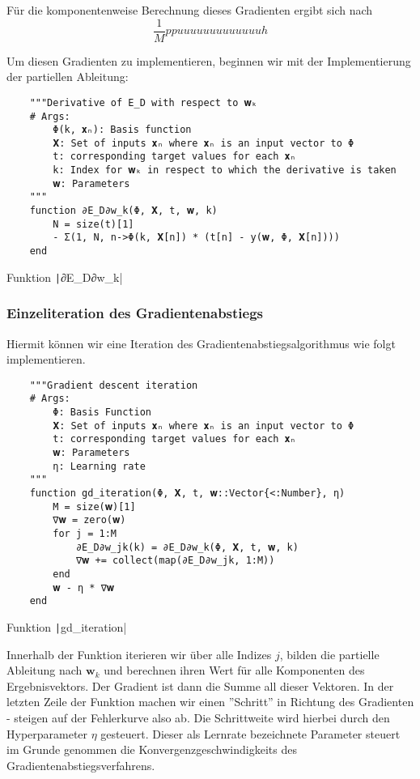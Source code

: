 \documentclass{article}
\theoremstyle{plain} %
\theoremstyle{definition} %
\begin{document}
Für die komponentenweise Berechnung dieses Gradienten ergibt sich nach \cite[S. 95f]{Lippe}
$$
  \frac{1}{M}ppuuuuuuuuuuuuuh
$$

Um diesen Gradienten zu implementieren, beginnen wir mit der Implementierung der partiellen Ableitung:

\begin{listing}[!ht]
  \begin{verbatim} 
    """Derivative of E_D with respect to 𝐰ₖ
    # Args:
        Φ(k, 𝐱ₙ): Basis function
        𝐗: Set of inputs 𝐱ₙ where 𝐱ₙ is an input vector to Φ
        t: corresponding target values for each 𝐱ₙ
        k: Index for 𝐰ₖ in respect to which the derivative is taken
        𝐰: Parameters
    """
    function ∂E_D∂w_k(Φ, 𝐗, t, 𝐰, k)
        N = size(t)[1]
        - Σ(1, N, n->Φ(k, 𝐗[n]) * (t[n] - y(𝐰, Φ, 𝐗[n])))
    end
  \end{verbatim}
  \caption{Funktion \texttt|∂E_D∂w_k|}
  \label{listing:partial}
\end{listing}

\subsubsection{Einzeliteration des Gradientenabstiegs}

Hiermit können wir eine Iteration des Gradientenabstiegsalgorithmus wie folgt implementieren.

\begin{listing}[!ht]
  \begin{verbatim} 
    """Gradient descent iteration
    # Args:
        Φ: Basis Function
        𝐗: Set of inputs 𝐱ₙ where 𝐱ₙ is an input vector to Φ
        t: corresponding target values for each 𝐱ₙ
        𝐰: Parameters
        η: Learning rate
    """
    function gd_iteration(Φ, 𝐗, t, 𝐰::Vector{<:Number}, η)
        M = size(𝐰)[1]
        ∇𝐰 = zero(𝐰)
        for j = 1:M
            ∂E_D∂w_jk(k) = ∂E_D∂w_k(Φ, 𝐗, t, 𝐰, k)
            ∇𝐰 += collect(map(∂E_D∂w_jk, 1:M))
        end
        𝐰 - η * ∇𝐰
    end
  \end{verbatim}
  \caption{Funktion \texttt|gd_iteration|}
  \label{listing:gd_iteration}
\end{listing}

Innerhalb der Funktion iterieren wir über alle Indizes $j$, bilden die partielle Ableitung nach $\mathbf{w}_k$ und berechnen ihren Wert für alle Komponenten des Ergebnisvektors. Der Gradient ist dann die Summe all dieser Vektoren. In der letzten Zeile der Funktion machen wir einen ''Schritt'' in Richtung des Gradienten - steigen auf der Fehlerkurve also ab. Die Schrittweite wird hierbei durch den Hyperparameter $\eta$ gesteuert. Dieser als Lernrate bezeichnete Parameter steuert im Grunde genommen die Konvergenzgeschwindigkeits des Gradientenabstiegsverfahrens.
\end{document}
